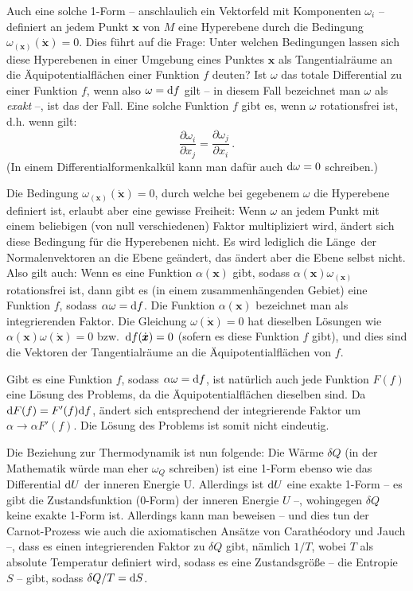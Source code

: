 Auch eine solche 1-Form -- anschlaulich ein Vektorfeld mit Komponenten $\omega_i$ --
definiert an jedem Punkt $\pmb{x}$ von $M$ eine Hyperebene durch die Bedingung
$\omega_{(\pmb{x})} (\dot{\pmb{x}}) = 0$. Dies f\"uhrt auf die Frage: Unter welchen Bedingungen
lassen sich diese Hyperebenen in einer Umgebung eines Punktes $\pmb{x}$ als Tangentialr\"aume
an die \"Aquipotentialfl\"achen einer Funktion $f$ deuten? Ist $\omega$ das
totale Differential zu einer Funktion $f$, wenn also $\omega = {\rm d}f$ gilt -- in diesem Fall bezeichnet
man $\omega$ als \textit{exakt} --, ist das der Fall. Eine solche Funktion $f$ gibt es, wenn $\omega$
rotationsfrei ist, d.h. wenn gilt:
\begin{equation}
                                  \frac{\partial \omega_i}{\partial x_j} =  \frac{\partial \omega_j}{\partial x_i} \, .
\end{equation}
(In einem Differentialformenkalk\"ul kann man daf\"ur auch ${\rm d}\omega =0$ schreiben.) 

Die Bedingung $\omega_{(\pmb{x})} (\dot{\pmb{x}}) = 0$, durch welche bei gegebenem $\omega$ die
Hyperebene definiert ist, erlaubt aber eine gewisse Freiheit: Wenn $\omega$ an jedem Punkt mit einem
beliebigen (von null verschiedenen) Faktor multipliziert wird, \"andert sich diese Bedingung f\"ur die
Hyperebenen nicht. Es wird lediglich die \glqq L\"ange\grqq\ der Normalenvektoren an die Ebene
ge\"andert, das \"andert aber die Ebene selbst nicht. Also gilt auch: Wenn es eine Funktion
$\alpha(\pmb{x})$ gibt, sodass $\alpha(\pmb{x}) \omega_{(\pmb{x})}$ rotationsfrei ist, dann gibt es
(in einem zusammenh\"angenden Gebiet) eine Funktion $f$, sodass $\alpha \omega= {\rm d}f$. Die
Funktion $\alpha(\pmb{x})$ bezeichnet man als \glqq integrierenden Faktor\grqq. Die Gleichung
$\omega(\dot{\pmb{x}})=0$ hat dieselben L\"osungen wie $\alpha(\pmb{x}) \omega(\dot{\pmb{x}})=0$ 
bzw.\ ${\rm d}f(\dot{\pmb{x}})=0$ (sofern es diese Funktion $f$ gibt), 
und dies sind die Vektoren der Tangentialr\"aume an die
\"Aquipotentialfl\"achen von $f$. 

Gibt es eine Funktion $f$, sodass $\alpha \omega ={\rm d}f$, ist nat\"urlich auch jede Funktion 
$F(f)$ eine L\"osung des Problems, da die \"Aquipotentialfl\"achen dieselben sind. 
Da ${\rm d}F(f)= F'(f) {\rm d}f$, \"andert sich entsprechend der integrierende Faktor um
$ \alpha \rightarrow \alpha F'(f)$. Die L\"osung des Problems ist somit nicht eindeutig. 

Die Beziehung zur Thermodynamik ist nun folgende: Die W\"arme 
$\delta Q$ (in der Mathematik w\"urde
man eher $\omega_Q$ schreiben) ist eine 1-Form ebenso wie das Differential ${\rm d}U$ 
der inneren Energie U. Allerdings ist ${\rm d}U$ eine exakte 1-Form -- es gibt die Zustandsfunktion 
(0-Form) der inneren Energie $U$ --, wohingegen $\delta Q$ keine exakte 1-Form ist. 
Allerdings kann man beweisen -- und dies tun der Carnot-Prozess wie auch die axiomatischen 
Ans\"atze von Carath\'{e}odory und Jauch --, dass es einen integrierenden Faktor zu $\delta Q$ gibt, 
n\"amlich $1/T$, wobei $T$ als absolute Temperatur definiert wird, sodass es eine 
Zustandsgr\"o\ss e -- die Entropie $S$ -- gibt, sodass $\delta Q/T = {\rm d}S$. 
  
